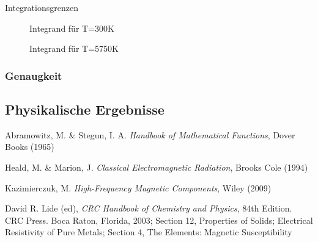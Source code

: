 \documentclass[10pt,a4paper]{article}
\begin{document}
Integrationsgrenzen
\begin{figure}[htbp]
\centering

\caption{Integrand für T=300K}
\end{figure}

\begin{figure}[htbp]
\centering

\caption{Integrand für T=5750K}
\end{figure}

\subsubsection{Genaugkeit}

\subsection{Physikalische Ergebnisse}
\label{ssec:physikalischeergebnisse}

\begin{thebibliography}{9}

Abramowitz, M. \& Stegun, I. A.
\emph{Handbook of Mathematical Functions},
Dover Books (1965)

Heald, M. \& Marion, J.
\emph{Classical Electromagnetic Radiation},
Brooks Cole (1994)

Kazimierczuk, M.
\emph{High-Frequency Magnetic Components},
Wiley (2009)

David R. Lide (ed),
\emph{CRC Handbook of Chemistry and Physics},
84th Edition. CRC Press. Boca Raton, Florida, 2003;
Section 12, Properties of Solids; Electrical Resistivity of Pure Metals;
Section 4, The Elements: Magnetic Susceptibility

\end{thebibliography}
\end{document}
